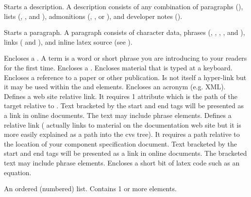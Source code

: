 \documentclass[11pt]{article}
\begin{document}
\begin{description}
   Starts a description.  A description consists
  of any combination of paragraphs (), lists
  (, , and ),
  admonitions (, , or ), and developer
  notes ().
  \begin{description}
     Starts a paragraph.  A paragraph consists of character
    data,  phrases (, , ,
    , and ), links ( and
    ), and inline latex source (see ).
    \begin{description}
       Encloses a .  A term is a word or short
      phrase you are introducing to your readers for the first time.
       Encloses a .
       Encloses material that is typed at a keyboard.
       Encloses a reference to a paper or other
      publication.  Is not itself a hyper-link but it may be used within the
       and  elements.
       Encloses an acronym (e.g.
      XML).
       Defines a \sci{} web site relative link.  It
      requires 1 attribute which is the path of the target relative to
      \sciurl.  Text bracketed by the start and end tags will be presented
      as a link in online documents.  The text may include phrase elements.
       Defines a \sr{} \cvs{} relative link
      ( actually links to material on the documentation web
      site but it is more easily explained as a path into the cvs tree).  It
      requires a path relative to the location of your component
      specification document.  Text bracketed by the start and end tags will
      be presented as a link in online documents.  The bracketed text may
      include phrase elements.
       Encloses a short bit of latex code such as an equation.
    \end{description}
      An ordered (numbered) list.  Contains 1 or
    more  elements.

\end{description}
\end{description}
\end{document}
